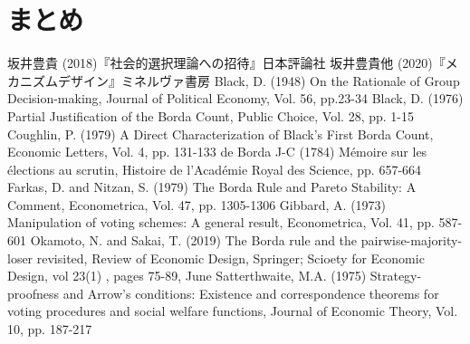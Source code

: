 \documentclass{jsarticle}
\begin{document}
\section{まとめ}

\begin{thebibliography}{9}
  坂井豊貴 (2018)『社会的選択理論への招待』日本評論社
  坂井豊貴他 (2020)『メカニズムデザイン』ミネルヴァ書房
  Black, D. (1948) On the Rationale of Group Decision-making, Journal of Political Economy,
  Vol. 56, pp.23-34
  Black, D. (1976) Partial Justification of the Borda Count, Public Choice,
  Vol. 28, pp. 1-15
  Coughlin, P. (1979) A Direct Characterization of Black's First Borda Count,
  Economic Letters, Vol. 4, pp. 131-133
  de Borda J-C (1784) M\'{e}moire sur les \'{e}lections au scrutin, Histoire de l'Acad\'{e}mie
  Royal des Science, pp. 657-664
  Farkas, D. and Nitzan, S. (1979) The Borda Rule and Pareto Stability: A Comment,
  Econometrica, Vol. 47, pp. 1305-1306
  Gibbard, A. (1973) Manipulation of voting schemes: A general result, Econometrica, Vol. 41,
  pp. 587-601
  Okamoto, N. and Sakai, T. (2019) The Borda rule and the pairwise-majority-loser
  revisited, Review of Economic Design, Springer; Scioety for Economic Design, vol 23(1)
  , pages 75-89, June
  Satterthwaite, M.A. (1975) Strategy-proofness and Arrow's conditions:
  Existence and correspondence theorems for voting procedures and social
  welfare functions, Journal of Economic Theory, Vol. 10, pp. 187-217
\end{thebibliography}
\end{document}
